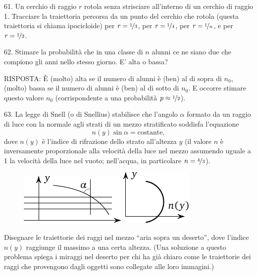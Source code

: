 \begin{problem}{61.}
	Un cerchio di raggio $r$ rotola senza strisciare all’interno di un cerchio di raggio  1.
	Tracciare la traiettoria percorsa da un punto del cerchio che rotola (questa traiettoria si chiama ipocicloide) per $r=\nicefrac{1}{3}$, per $r=\nicefrac{1}{4}$, per $r=\nicefrac{1}{n}$, e per $r=\nicefrac{1}{2}$.
\end{problem}

\begin{problem}{62.}
	Stimare la probabilità che in una classe di $n$ alunni ce ne siano due che compiono gli anni nello stesso giorno. E’ alta o bassa?

	\begin{note}{RISPOSTA:}
		È (molto) alta se il numero di alunni è (ben) al di sopra di $n_0$,
		(molto) bassa se il numero di alunni è (ben) al di sotto di  $n_0$. E occorre stimare questo valore  $n_0$
		(corrispondente a una probabilità $p \approx \nicefrac{1}{2}$).
	\end{note}
\end{problem}

\begin{problem}{63.}
	La legge di Snell (o di Snellius) stabilisce che l’angolo  $\alpha$ formato da un raggio di luce con la normale agli strati di un mezzo stratificato soddisfa l’equazione
	\begin{equation*}
		n(y) \sin \alpha=\text{costante},
	\end{equation*}
	dove $n(y)$ è l’indice di rifrazione dello strato all’altezza $y$ (il valore $n$ è inversamente proporzionale alla velocità della luce nel mezzo assumendo uguale a 1 la velocità della luce nel vuoto; nell’acqua, in particolare $n=\nicefrac{4}{3}$).
	\begin{figure}
		\null\hfill
		\includegraphics{resources/taskbook-47}
		\hfill
		\includegraphics{resources/taskbook-471}
		\hfill\null
	\end{figure}

	Disegnare le traiettorie dei raggi nel mezzo  \enquote{aria sopra un deserto}, dove l'indice $n(y)$ raggiunge il massimo a una certa altezza. (Una soluzione a questo problema spiega i miraggi nel deserto per chi ha già chiaro come le traiettorie dei raggi che provengono dagli oggetti sono collegate alle loro immagini.)
\end{problem}

